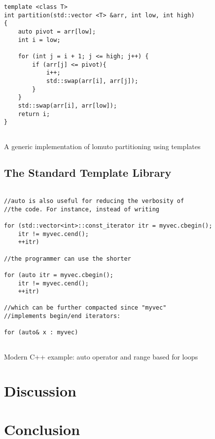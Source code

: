\documentclass[conference, a4paper]{IEEEtran}
\begin{document}
\begin{listing}[h]
\begin{verbatim}
template <class T>
int partition(std::vector <T> &arr, int low, int high)
{
    auto pivot = arr[low];
    int i = low;

    for (int j = i + 1; j <= high; j++) {
        if (arr[j] <= pivot){
            i++;
            std::swap(arr[i], arr[j]);
        }
    }
    std::swap(arr[i], arr[low]);
    return i; 
}
        
    \end{verbatim}
    
    \caption{A generic implementation of lomuto partitioning using templates}
\label{listing:2}
\end{listing}

\subsection{The Standard Template Library}


\begin{listing}[h]
\begin{verbatim}

//auto is also useful for reducing the verbosity of
//the code. For instance, instead of writing

for (std::vector<int>::const_iterator itr = myvec.cbegin();
    itr != myvec.cend();
    ++itr)

//the programmer can use the shorter

for (auto itr = myvec.cbegin();
    itr != myvec.cend();
    ++itr)

//which can be further compacted since "myvec"
//implements begin/end iterators:

for (auto& x : myvec)
        
    \end{verbatim}

    \caption{Modern C++ example: auto operator and range based for loops \cite{C++11_2021}}
\label{listing:3}
\end{listing}









\section{Discussion}

\section{Conclusion}

\clearpage



\end{document}
